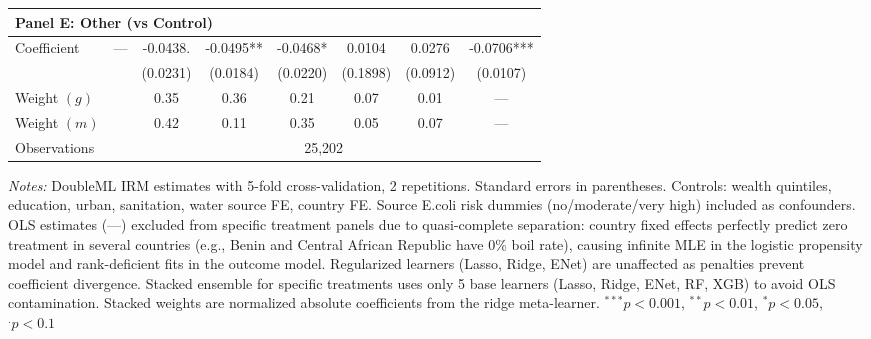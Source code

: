 \begin{table}[htbp]
\begin{tabular}{lccccccc}
\multicolumn{8}{l}{\textbf{Panel E: Other (vs Control)}} \\
\midrule
Coefficient & --- & -0.0438. & -0.0495** & -0.0468* & 0.0104 & 0.0276 & -0.0706*** \\
 &  & (0.0231) & (0.0184) & (0.0220) & (0.1898) & (0.0912) & (0.0107) \\
Weight $(g)$ &  & 0.35 & 0.36 & 0.21 & 0.07 & 0.01 & — \\
Weight $(m)$ &  & 0.42 & 0.11 & 0.35 & 0.05 & 0.07 & — \\

\midrule
Observations & \multicolumn{7}{c}{25,202} \\
\bottomrule
\end{tabular}
\begin{minipage}{\textwidth}
\footnotesize
\textit{Notes:} DoubleML IRM estimates with 5-fold cross-validation, 2 repetitions. 
Standard errors in parentheses. 
Controls: wealth quintiles, education, urban, sanitation, water source FE, country FE. 
Source E.coli risk dummies (no/moderate/very high) included as confounders. 
OLS estimates (---) excluded from specific treatment panels due to quasi-complete separation: 
country fixed effects perfectly predict zero treatment in several countries (e.g., Benin and Central African Republic have 0\% boil rate), 
causing infinite MLE in the logistic propensity model and rank-deficient fits in the outcome model. 
Regularized learners (Lasso, Ridge, ENet) are unaffected as penalties prevent coefficient divergence. 
Stacked ensemble for specific treatments uses only 5 base learners (Lasso, Ridge, ENet, RF, XGB) to avoid OLS contamination. 
Stacked weights are normalized absolute coefficients from the ridge meta-learner. 
$^{***}p<0.001$, $^{**}p<0.01$, $^{*}p<0.05$, $^{.}p<0.1$
\end{minipage}
\end{table}
